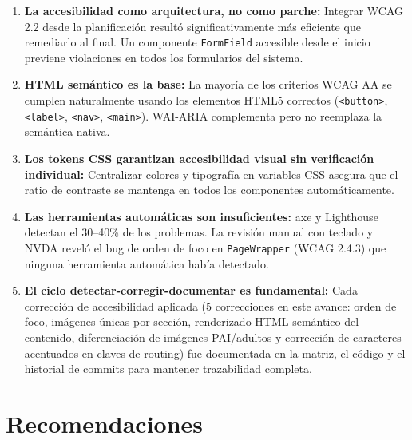 \documentclass[12pt, a4paper]{article}
\begin{document}
\begin{enumerate}
  \item \textbf{La accesibilidad como arquitectura, no como parche:} Integrar WCAG 2.2 desde la planificación resultó significativamente más eficiente que remediarlo al final. Un componente \texttt{FormField} accesible desde el inicio previene violaciones en todos los formularios del sistema.

  \item \textbf{HTML semántico es la base:} La mayoría de los criterios WCAG AA se cumplen naturalmente usando los elementos HTML5 correctos (\texttt{<button>}, \texttt{<label>}, \texttt{<nav>}, \texttt{<main>}). WAI-ARIA complementa pero no reemplaza la semántica nativa.

  \item \textbf{Los tokens CSS garantizan accesibilidad visual sin verificación individual:} Centralizar colores y tipografía en variables CSS asegura que el ratio de contraste se mantenga en todos los componentes automáticamente.

  \item \textbf{Las herramientas automáticas son insuficientes:} axe y Lighthouse detectan el 30--40\% de los problemas. La revisión manual con teclado y NVDA reveló el bug de orden de foco en \texttt{PageWrapper} (WCAG 2.4.3) que ninguna herramienta automática había detectado.

  \item \textbf{El ciclo detectar-corregir-documentar es fundamental:} Cada corrección de accesibilidad aplicada (5 correcciones en este avance: orden de foco, imágenes únicas por sección, renderizado HTML semántico del contenido, diferenciación de imágenes PAI/adultos y corrección de caracteres acentuados en claves de routing) fue documentada en la matriz, el código y el historial de commits para mantener trazabilidad completa.
\end{enumerate}

\section{Recomendaciones}
\end{document}
